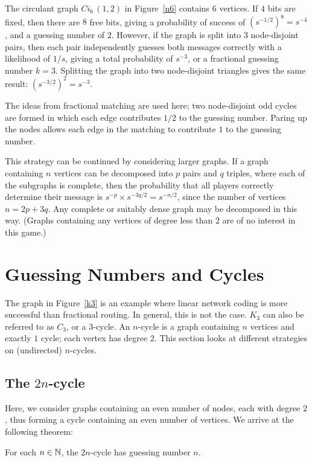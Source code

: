 The circulant graph $Ci_6 \, (1, 2)$ in Figure~\ref{n6} contains $6$ vertices. If $4$ bits are fixed, then there are $8$ free bits, giving a probability of success of $(s^{-1/2})^8 = s^{-4}$, and a guessing number of $2$. However, if the graph is split into $3$ node-disjoint pairs, then each pair independently guesses both messages correctly with a likelihood of $1/s$, giving a total probability of $s^{-3}$, or a fractional guessing number $k = 3$. Splitting the graph into two node-disjoint triangles gives the same result: $(s^{-3/2})^2 = s^{-3}$.

The ideas from fractional matching are used here; two node-disjoint odd cycles are formed in which each edge contributes $1/2$ to the guessing number. Paring up the nodes allows each edge in the matching to contribute $1$ to the guessing number.

This strategy can be continued by considering larger graphs. If a graph containing $n$ vertices can be decomposed into $p$ pairs and $q$ triples, where each of the subgraphs is complete, then the probability that all players correctly determine their message is $s^{-p} \times s^{-3q/2} = s^{-n/2}$, since the number of vertices $n = 2p + 3q$. Any complete or suitably dense graph may be decomposed in this way. (Graphs containing any vertices of degree less than $2$ are of no interest in this game.)

\section{Guessing Numbers and Cycles}

The graph in Figure~\ref{k3} is an example where linear network coding is more successful than fractional routing. In general, this is not the case. $K_3$ can also be referred to as $C_3$, or a $3$-cycle. An $n$-cycle is a graph containing $n$ vertices and exactly $1$ cycle; each vertex has degree $2$. This section looks at different strategies on (undirected) $n$-cycles.

\subsection{The $2n$-cycle}

Here, we consider graphs containing an even number of nodes, each with degree $2$, thus forming a cycle containing an even number of vertices. We arrive at the following theorem:

\begin{theorem}
 For each $n \in \mathbb{N}$, the $2n$-cycle has guessing number $n$.
\end{theorem}

